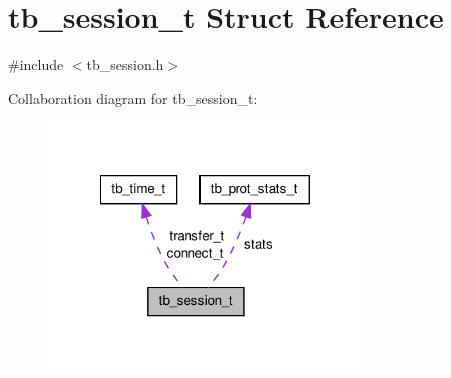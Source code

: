 \hypertarget{structtb__session__t}{\section{tb\-\_\-session\-\_\-t Struct Reference}
\label{structtb__session__t}
}


{\ttfamily \#include $<$tb\-\_\-session.\-h$>$}



Collaboration diagram for tb\-\_\-session\-\_\-t\-:\nopagebreak
\begin{figure}[H]
\begin{center}
\leavevmode
\includegraphics[width=236pt]{structtb__session__t__coll__graph}
\end{center}
\end{figure}
